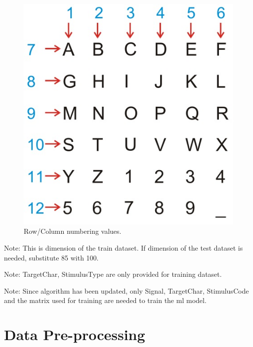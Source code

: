 \begin{figure}
    \centering
    \includegraphics[width=\figureWidth]{images/approach/row_column_numbering.jpg}
    \caption{Row/Column numbering values.}
    \label{fig:row-column-numbering}
\end{figure}
Note: This is dimension of the train dataset. If dimension of the test dataset is needed, substitute 85 with 100.\par
Note: TargetChar, StimulusType are only provided for training dataset.\par
Note: Since algorithm has been updated, only Signal, TargetChar, StimulusCode and the matrix used for training are needed to train the \ac{ml} model.\par
\clearpage






\section{Data Pre-processing}
